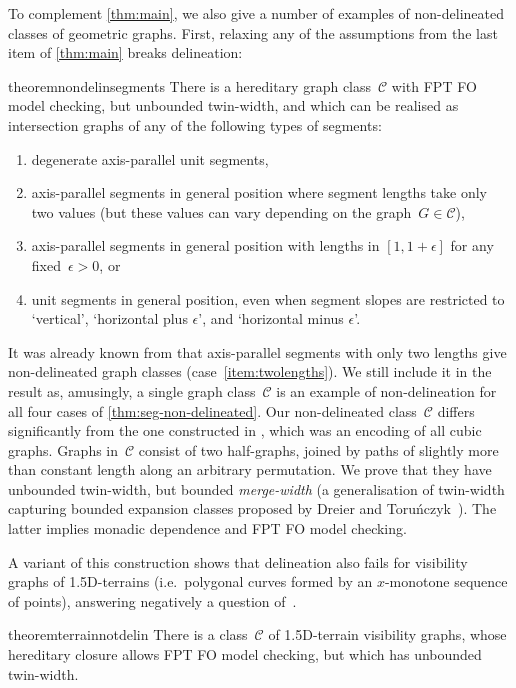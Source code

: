 \documentclass[a4paper,UKenglish,cleveref,thm-restate]{lipics-v2021}
\theoremstyle{remark}
\newcommand{\Cc}{\mathcal{C}}
\begin{document}
To complement \cref{thm:main}, we also give a number of examples of non-delineated classes of geometric graphs.
First, relaxing any of the assumptions from the last item of \cref{thm:main} breaks delineation:
\begin{restatable}{theorem}{nondelinsegments}\label{thm:seg-non-delineated}
    There is a hereditary graph class~$\Cc$ with FPT FO model checking, but unbounded twin-width,
    and which can be realised as intersection graphs of any of the following types of segments:
    \begin{enumerate}
        \item \label{item:degen} degenerate axis-parallel unit segments,
        \item \label{item:twolengths} axis-parallel segments in general position where segment lengths take only two values (but these values can vary depending on the graph~$G \in \Cc$),
        \item \label{item:epsilon-lengths} axis-parallel segments in general position with lengths in $[1,1+\epsilon]$ for any fixed~$\epsilon > 0$, or
        \item \label{item:epsilon-directions} unit segments in general position, even when segment slopes are restricted to `vertical', `horizontal plus $\epsilon$', and `horizontal minus $\epsilon$'.
    \end{enumerate}
\end{restatable}
It was already known from \cite[Figure~8]{bonnet2022delineation} that axis-parallel segments with only two lengths give non-delineated graph classes (case~\ref{item:twolengths}).
We still include it in the result as, amusingly, a single graph class~$\Cc$ is an example of non-delineation for all four cases of \cref{thm:seg-non-delineated}.
Our non-delineated class~$\Cc$ differs significantly from the one constructed in \cite[Figure~8]{bonnet2022delineation}, which was an encoding of all cubic graphs.
Graphs in~$\Cc$ consist of two half-graphs, joined by paths of slightly more than constant length along an arbitrary permutation.
We prove that they have unbounded twin-width, but bounded \emph{merge-width} (a generalisation of twin-width capturing bounded expansion classes proposed by Dreier and Toruńczyk~\cite{merge-width}).
The latter implies monadic dependence and FPT FO model checking.

A variant of this construction shows that delineation also fails for visibility graphs of 1.5D-terrains (i.e.\ polygonal curves formed by an $x$-monotone sequence of points), answering negatively a question of~\cite{bonnet2022delineation}.
\begin{restatable}{theorem}{terrainnotdelin}\label{thm:terrain-not-delin}
    There is a class~$\Cc$ of 1.5D-terrain visibility graphs, whose hereditary closure allows FPT FO model checking, but which has unbounded twin-width.
\end{restatable}
\end{document}
